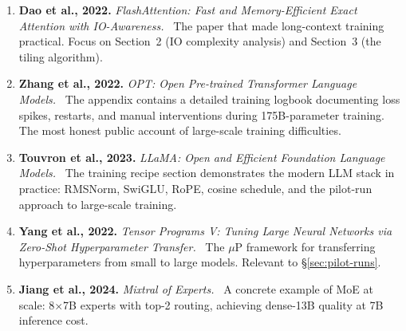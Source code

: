 \begin{enumerate}[nosep]
  \item \textbf{Dao et al., 2022.} \textit{FlashAttention: Fast and Memory-Efficient Exact Attention with IO-Awareness.}~\cite{dao2022flashattention} The paper that made long-context training practical. Focus on Section~2 (IO complexity analysis) and Section~3 (the tiling algorithm).
  \item \textbf{Zhang et al., 2022.} \textit{OPT: Open Pre-trained Transformer Language Models.}~\cite{zhang2022opt} The appendix contains a detailed training logbook documenting loss spikes, restarts, and manual interventions during 175B-parameter training. The most honest public account of large-scale training difficulties.
  \item \textbf{Touvron et al., 2023.} \textit{LLaMA: Open and Efficient Foundation Language Models.}~\cite{touvron2023llama} The training recipe section demonstrates the modern LLM stack in practice: RMSNorm, SwiGLU, RoPE, cosine schedule, and the pilot-run approach to large-scale training.
  \item \textbf{Yang et al., 2022.} \textit{Tensor Programs V: Tuning Large Neural Networks via Zero-Shot Hyperparameter Transfer.}~\cite{yang2022tensor} The $\mu$P framework for transferring hyperparameters from small to large models. Relevant to \S\ref{sec:pilot-runs}.
  \item \textbf{Jiang et al., 2024.} \textit{Mixtral of Experts.}~\cite{jiang2024mixtral} A concrete example of MoE at scale: 8$\times$7B experts with top-2 routing, achieving dense-13B quality at 7B inference cost.
\end{enumerate}
